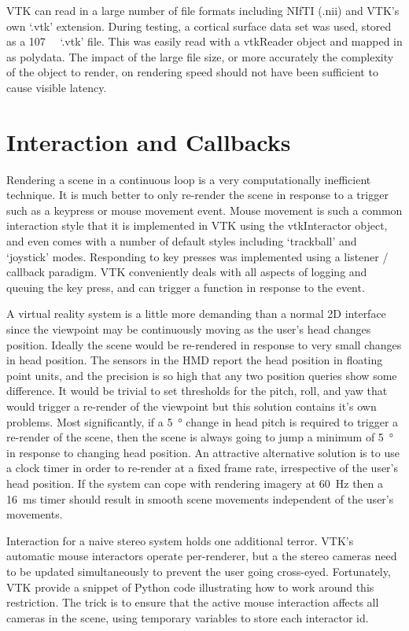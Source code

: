 \documentclass[MSc,paper=a4,pagesize=auto]{icldt}
\begin{document}
VTK can read in a large number of file formats including NIfTI (.nii) and VTK's own `.vtk' extension. During testing, a cortical surface data set was used, stored as a \SI{107}{\mebi\byte} `.vtk' file. This was easily read with a vtkReader object and mapped in as polydata. The impact of the large file size, or more accurately the complexity of the object to render, on rendering speed should not have been sufficient to cause visible latency.

\section{Interaction and Callbacks}
Rendering a scene in a continuous loop is a very computationally inefficient technique. It is much better to only re-render the scene in response to a trigger such as a keypress or mouse movement event. Mouse movement is such a common interaction style that it is implemented in VTK using the vtkInteractor object, and even comes with a number of default styles including `trackball' and `joystick' modes. Responding to key presses was implemented using a listener  / callback paradigm. VTK conveniently deals with all aspects of logging and queuing the key press, and can trigger a function in response to the event. 

A virtual reality system is a little more demanding than a normal 2D interface since the viewpoint may be continuously moving as the user's head changes position. Ideally the scene would be re-rendered in response to very small changes in head position. The sensors in the HMD report the head position in floating point units, and the precision is so high that any two position queries show some difference. It would be trivial to set thresholds for the pitch, roll, and yaw that would trigger a re-render of the viewpoint but this solution contains it's own problems. Most significantly, if a \SI{5}{\degree} change in head pitch is required to trigger a re-render of the scene, then the scene is always going to jump a minimum of \SI{5}{\degree} in response to changing head position. An attractive alternative solution is to use a clock timer in order to re-render at a fixed frame rate, irrespective of the user's head position. If the system can cope with rendering imagery at \SI{60}{\Hz} then a \SI{16}{\ms} timer should result in smooth scene movements independent of the user's movements.

Interaction for a naive stereo system holds one additional terror. VTK's automatic mouse interactors operate per-renderer, but a the stereo cameras need to be updated simultaneously to prevent the user going cross-eyed. Fortunately, VTK provide a snippet of Python code illustrating how to work around this restriction. The trick is to ensure that the active mouse interaction affects all cameras in the scene, using temporary variables to store each interactor id. 
\end{document}

